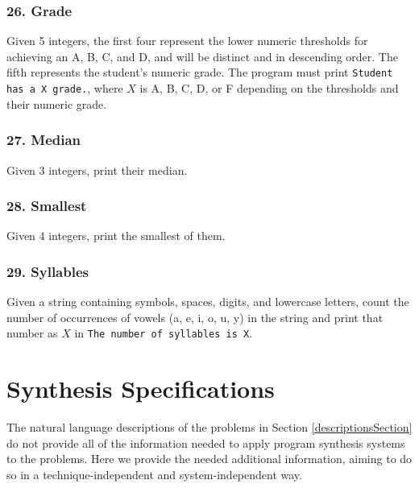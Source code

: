 \documentclass{sig-alternate}
\begin{document}
\subsubsection*{26. Grade}
Given 5 integers, the first four represent the lower numeric thresholds for achieving an A, B, C, and D, and will be distinct and in descending order. The fifth represents the student's numeric grade. The program must print \texttt{Student has a X grade.}, where $X$ is A, B, C, D, or F depending on the thresholds and their numeric grade.

\subsubsection*{27. Median}
Given 3 integers, print their median.

\subsubsection*{28. Smallest}
Given 4 integers, print the smallest of them.

\subsubsection*{29. Syllables}
Given a string containing symbols, spaces, digits, and lowercase letters, count the number of occurrences of vowels (a, e, i, o, u, y) in the string and print that number as $X$ in \texttt{The number of syllables is X}.

\section{Synthesis Specifications} \label{synthProbSpec}



The natural language descriptions of the problems in Section \ref{descriptionsSection} do not provide all of the information needed to apply program synthesis systems to the problems. Here we provide the needed additional information, aiming to do so in a technique-independent and system-independent way.
\end{document}
